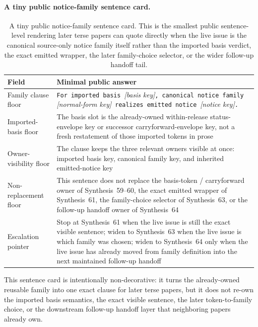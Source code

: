 \documentclass[11pt]{article}
\begin{document}
\paragraph{A tiny public notice-family sentence card.}
\begin{table}[t]
\centering
\small
\begin{tabularx}{\linewidth}{@{}lX@{}}
\toprule
Field & Minimal public answer \\
\midrule
Family clause floor & \texttt{For imported basis }\emph{[basis key]}\texttt{, canonical notice family }\emph{[normal-form key]}\texttt{ realizes emitted notice }\emph{[notice key]}\texttt{.} \\
Imported-basis floor & The basis slot is the already-owned within-release status-envelope key or successor carryforward-envelope key, not a fresh restatement of those imported tokens in prose \\
Owner-visibility floor & The clause keeps the three relevant owners visible at once: imported basis key, canonical family key, and inherited emitted-notice key \\
Non-replacement floor & This sentence does not replace the basis-token / carryforward owner of Synthesis~59--60, the exact emitted wrapper of Synthesis~61, the family-choice selector of Synthesis~63, or the follow-up handoff owner of Synthesis~64 \\
Escalation pointer & Stop at Synthesis~61 when the live issue is still the exact visible sentence; widen to Synthesis~63 when the live issue is which family was chosen; widen to Synthesis~64 only when the live issue has already moved from family definition into the next maintained follow-up handoff \\
\bottomrule
\end{tabularx}
\caption{A tiny public notice-family sentence card. This is the smallest public sentence-level rendering later terse papers can quote directly when the live issue is the canonical source-only notice family itself rather than the imported basis verdict, the exact emitted wrapper, the later family-choice selector, or the wider follow-up handoff tail.}
\label{tab:tiny-public-notice-family-sentence-card}
\end{table}

This sentence card is intentionally non-decorative: it turns the already-owned reusable family into one exact clause for later terse papers, but it does not re-own the imported basis semantics, the exact visible sentence, the later token-to-family choice, or the downstream follow-up handoff layer that neighboring papers already own.\cite{series:workedexample}
\end{document}
